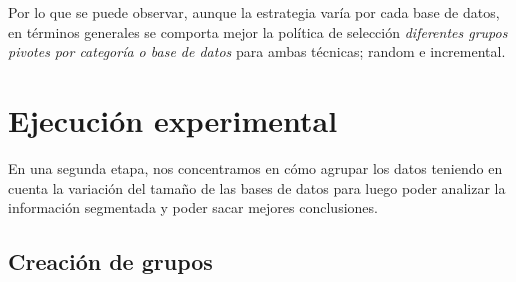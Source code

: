 \begin{comment} 

\begin{figure}[H]
	\begin{center}
		\texttt{[image: imagenes/same\_vs\_different/16p\_incremental.eps]}
		\caption{\small Estrategia de selecci\'on incremental para 16 pivotes: mismos pivotes vs diferentes}
		\label{fig:same-vs-diff-Incremental-16Pivotes}

		\texttt{[image: imagenes/same\_vs\_different/16p\_random.eps]}
		\caption{\small Estrategia de selecci\'on random para 16 pivotes: mismos pivotes vs diferentes}
		\label{fig:same-vs-diff-random-16Pivotes}	

		\texttt{[image: imagenes/same\_vs\_different/64p\_incremental.eps]}
		\caption{\small Estrategia de selecci\'on incremental para 64 pivotes: mismos pivotes vs diferentes}
		\label{fig:same-vs-diff-Incremental-64Pivotes}
		
		\texttt{[image: imagenes/same\_vs\_different/16p\_random.eps]}
		\caption{\small Estrategia de selecci\'on random para 64 pivotes: mismos pivotes vs diferentes}
		\label{fig:same-vs-diff-random-64Pivotes}
	\end{center}
\end{figure}

\end{comment}

Por lo que se puede observar, aunque la estrategia var\'ia por cada base de datos, en t\'erminos generales se comporta mejor la pol\'itica de selecci\'on  \textit{diferentes grupos pivotes por categor\'ia o base de datos} para ambas t\'ecnicas; random e incremental.\\


\section{Ejecuci\'on experimental}

En una segunda etapa,  nos concentramos en c\'omo agrupar los datos teniendo en cuenta la variaci\'on del tama\~no de las bases de datos para luego poder analizar la informaci\'on segmentada y poder sacar mejores conclusiones.\\

\subsection{Creaci\'on de grupos}

